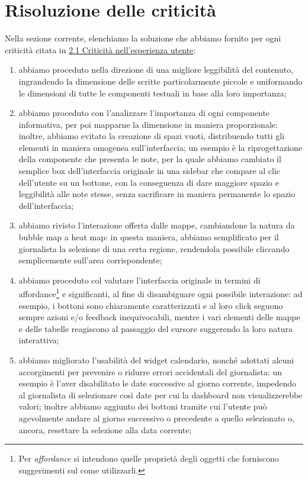 \documentclass[../../main.tex]{subfiles}
\begin{document}
\section{Risoluzione delle criticità}
Nella sezione corrente, elenchiamo la soluzione che abbiamo fornito per ogni criticità citata in \hyperref[ss:criticita]{2.1 Criticità nell’esperienza utente}:
\begin{enumerate}
    \item [{\hyperref[el:1]{1.}}] abbiamo proceduto nella direzione di una migliore leggibilità del contenuto, ingrandendo la dimensione delle scritte particolarmente piccole e uniformando le dimensioni di tutte le componenti testuali in base alla loro importanza;
    \item [{\hyperref[el:2]{2.}}] abbiamo proceduto con l'analizzare l'importanza di ogni componente informativa, per poi mapparne la dimensione in maniera proporzionale: inoltre, abbiamo evitato la creazione di spazi vuoti, distribuendo tutti gli elementi in maniera omogenea sull'interfaccia; un esempio è la riprogettazione della componente che presenta le note, per la quale abbiamo cambiato il semplice box dell'interfaccia originale in una sidebar che compare al clic dell'utente su un bottone, con la conseguenza di dare maggiore spazio e leggibilità alle note stesse, senza sacrificare in maniera permanente lo spazio dell'interfaccia;
    \item [{\hyperref[el:3]{3.}}] abbiamo rivisto l'interazione offerta dalle mappe, cambiandone la natura da bubble map a heat map: in questa maniera, abbiamo semplificato per il giornalista la selezione di una certa regione, rendendola possibile cliccando semplicemente sull'area corrispondente;
    \item [{\hyperref[el:4]{4.}}] abbiamo proceduto col valutare l'interfaccia originale in termini di affordance\footnote{Per \textit{affordance} si intendono quelle proprietà degli oggetti che forniscono suggerimenti sul come utilizzarli.} e significanti, al fine di disambiguare ogni possibile interazione: ad esempio, i bottoni sono chiaramente caratterizzati e al loro click seguono sempre azioni e/o feedback inequivocabili, mentre i vari elementi delle mappe e delle tabelle reagiscono al passaggio del cursore suggerendo la loro natura interattiva;
    \item [{\hyperref[el:5]{5.}}] abbiamo migliorato l'usabilità del widget calendario, nonché adottati alcuni accorgimenti per prevenire o ridurre errori accidentali del giornalista: un esempio è l'aver disabilitato le date successive al giorno corrente, impedendo al giornalista di selezionare così date per cui la dashboard non visualizzerebbe valori; inoltre abbiamo aggiunto dei bottoni tramite cui l'utente può agevolmente andare al giorno successivo o precedente a quello selezionato o, ancora, resettare la selezione alla data corrente;

\end{enumerate}
\end{document}
